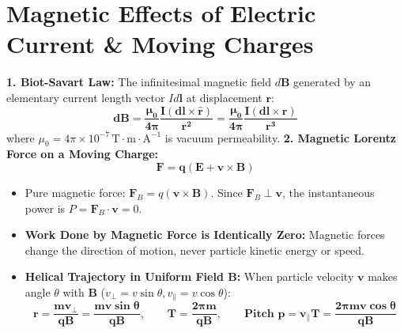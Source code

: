 \documentclass[10pt,a4paper]{article}
\begin{document}
\section{Magnetic Effects of Electric Current \& Moving Charges}

\begin{conceptbox}
\textbf{1. Biot-Savart Law:}
The infinitesimal magnetic field $d\mathbf{B}$ generated by an elementary current length vector $I d\mathbf{l}$ at displacement $\mathbf{r}$:
\begin{equation}
  \mathbf{d\mathbf{B} = \frac{\mu_0}{4\pi} \frac{I (d\mathbf{l} \times \hat{\mathbf{r}})}{r^2} = \frac{\mu_0}{4\pi} \frac{I (d\mathbf{l} \times \mathbf{r})}{r^3}}
\end{equation}
where $\mu_0 = 4\pi \times 10^{-7}\,\mathrm{T}\cdot\mathrm{m}\cdot\mathrm{A}^{-1}$ is vacuum permeability.
\textbf{2. Magnetic Lorentz Force on a Moving Charge:}
\begin{equation}
  \mathbf{\mathbf{F} = q(\mathbf{E} + \mathbf{v} \times \mathbf{B})}
\end{equation}
\begin{itemize}
  \item Pure magnetic force: $\mathbf{F}_B = q(\mathbf{v} \times \mathbf{B})$. Since $\mathbf{F}_B \perp \mathbf{v}$, the instantaneous power is $P = \mathbf{F}_B \cdot \mathbf{v} = 0$.
  \item \textbf{Work Done by Magnetic Force is Identically Zero:} Magnetic forces change the direction of motion, never particle kinetic energy or speed.
  \item \textbf{Helical Trajectory in Uniform Field $\mathbf{B}$:}
  When particle velocity $\mathbf{v}$ makes angle $\theta$ with $\mathbf{B}$ ($v_\perp = v\sin\theta, v_\parallel = v\cos\theta$):
  \begin{equation}
    \mathbf{r = \frac{m v_\perp}{q B} = \frac{m v \sin\theta}{q B}}, \qquad \mathbf{T = \frac{2\pi m}{q B}}, \qquad \mathbf{\text{Pitch } p = v_\parallel T = \frac{2\pi m v \cos\theta}{q B}}
  \end{equation}
\end{itemize}
\end{conceptbox}
\end{document}
